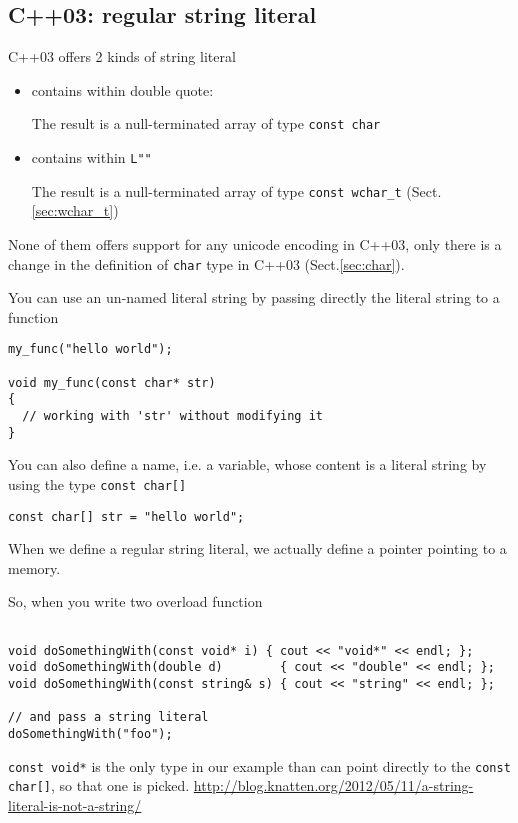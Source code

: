 \subsection{C++03: regular string literal}
\label{sec:regular-string-literal}

C++03 offers 2 kinds of string literal 
\begin{itemize}
  \item contains within double quote:
  
  The result is a null-terminated array of type \verb!const char!

  \item contains within \verb!L""!
  
  The result is a null-terminated array of type \verb!const wchar_t!
  (Sect.\ref{sec:wchar_t})
  
\end{itemize}
None of them offers support for any unicode encoding in C++03, only there is a
change in the definition of \verb!char! type in C++03 (Sect.\ref{sec:char}).

You can use an un-named literal string by passing directly the literal string to
a function
\begin{verbatim}
my_func("hello world");

void my_func(const char* str)
{
  // working with 'str' without modifying it
}
\end{verbatim}

You can also define a name, i.e. a variable, whose content is a literal string
by using the type \verb!const char[]!
\begin{verbatim}
const char[] str = "hello world";
\end{verbatim}
When we define a regular string literal, we actually define a pointer pointing
to a memory.

So, when you write two overload function
\begin{verbatim}

void doSomethingWith(const void* i) { cout << "void*" << endl; };
void doSomethingWith(double d)        { cout << "double" << endl; };
void doSomethingWith(const string& s) { cout << "string" << endl; };

// and pass a string literal
doSomethingWith("foo");
\end{verbatim}
\verb!const void*! is the only type in our example than can point directly to
the \verb!const char[]!, so that one is picked. 
\url{http://blog.knatten.org/2012/05/11/a-string-literal-is-not-a-string/}

